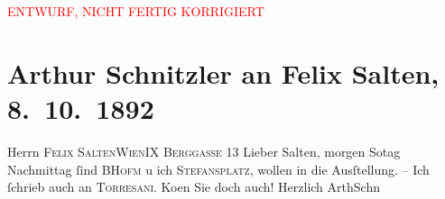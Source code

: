 
\begin{center}
            \textcolor{red}{ENTWURF, NICHT FERTIG KORRIGIERT}
                      \end{center}
            
         
         \renewcommand{\erwaehntePersonen}{Personen: Richard Beer-Hofmann, Felix Salten, Carl von Torresani-Lanzenfeld}
         \renewcommand{\erwaehnteInstitutionen}{Institutionen: Wiener Musik- und Theaterausstellung 1892}
         \renewcommand{\erwaehnteOrte}{Orte: Berggasse, Stephansplatz, Wien}
         \renewcommand{\erwaehnteWerke}{}
               \section[Arthur Schnitzler an Felix Salten, 8. 10. 1892]{ Arthur Schnitzler an Felix Salten, 8. 10. 1892}\nopagebreak{}\rehead{ }\begin{ledgroupsized}[t]{13cm}\normalsize\beginnumbering \toendnotes[C]{\smallbreak\pagebreak[2]} 
\pstart{}{\pb}Herrn \textsc{Felix
                     Salten}\pend{}\pstart{}\textsc{Wien}\pend{}\pstart{}\textsc{IX Berggasse 13 }\pend{}{\bigskip}\pstart{}{\pb}Lieber Salten,\pend\pstart
           morgen So{\geminationn}tag{ }Nachmittag  ſind \textsc{BHofm} u ich \textsc{Stefansplatz}, wollen in die Ausſtellung. – Ich ſchrieb
               auch an \textsc{Torresani}. Ko{\geminationm}en Sie doch auch! \pend
           \pstart Herzlich \spacefill\mbox{ArthSchn}\pend{}
         
         \endnumbering{}\end{ledgroupsized}\begin{anhang}\end{anhang}\newcommand{\dateiname}{L02957}\newcommand{\titel}{Arthur Schnitzler an Felix Salten, 8. 10. 1892}\newcommand{\editorInnen}{Martin Anton Müller und Laura Untner}
      